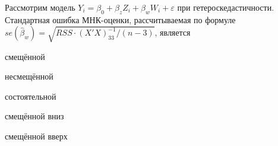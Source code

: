 
\begin{question}
Рассмотрим модель
\(Y_i= \beta_0 + \beta_z Z_{i} + \beta_w W_{i} + \varepsilon\) при
гетероскедастичности. Стандартная ошибка МНК-оценки, рассчитываемая по
формуле \(se(\hat\beta_w)=\sqrt{RSS \cdot (X'X)^{-1}_{33}/(n-3)}\),
является
\begin{answerlist}
  \item смещённой
  \item несмещённой
  \item состоятельной
  \item смещённой вниз
  \item смещённой вверх
\end{answerlist}
\end{question}


